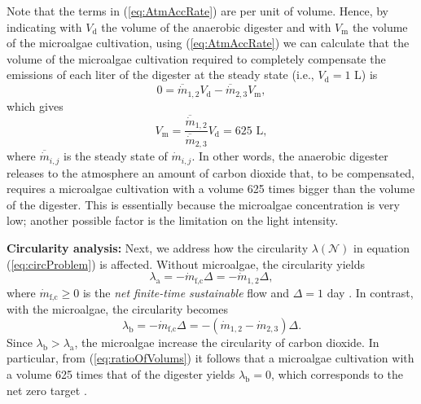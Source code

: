 \documentclass[lettersize,journal]{IEEEtran}
\begin{document}
Note that the terms in (\ref{eq:AtmAccRate}) are per unit of volume. Hence, by indicating with $V_\text{d}$ the volume of the anaerobic digester and with $V_\text{m}$ the volume of the microalgae cultivation, using (\ref{eq:AtmAccRate}) we can calculate that the volume of the microalgae cultivation required to completely compensate the emissions of each liter of the digester at the steady state (i.e., $V_{\text{d}} = 1$ L) is
\begin{equation}
0 = \overline{\dot{m}}_{1,2} V_\text{d} - \overline{\dot{m}}_{2,3} V_\text{m}, 
\end{equation}
which gives
\begin{equation}\label{eq:ratioOfVolums}
V_\text{m} = \frac{\overline{\dot{m}}_{1,2}}{\overline{\dot{m}}_{2,3}}V_\text{d} = 625 \,\, \text{L},
\end{equation}    
where $\overline{\dot{m}}_{i,j}$ is the steady state of $\dot{m}_{i,j}$. In other words, the anaerobic digester releases to the atmosphere an amount of carbon dioxide that, to be compensated, requires a microalgae cultivation with a volume 625 times bigger than the volume of the digester. This is essentially because the microalgae concentration is very low; another possible factor is the limitation on the light intensity. 


\textbf{Circularity analysis:} Next, we address how the circularity $\lambda(\mathcal{N})$ in equation (\ref{eq:circProblem}) is affected. Without microalgae, the circularity yields 
\begin{equation}
\lambda_\text{a} = - \dot{m}_{\text{f,c}}\Delta = - \dot{m}_{1,2}\Delta,
\end{equation}
where $\dot{m}_{\text{f,c}} \geq 0$ is the \emph{net finite-time sustainable} flow and $\Delta = 1$ day \cite{zocco2024circular}. In contrast, with the microalgae, the circularity becomes 
\begin{equation}
\lambda_\text{b} = - \dot{m}_{\text{f,c}}\Delta = - (\dot{m}_{1,2} - \dot{m}_{2,3})\Delta. 
\end{equation}
Since $\lambda_\text{b} > \lambda_\text{a}$, the microalgae increase the circularity of carbon dioxide. In particular, from (\ref{eq:ratioOfVolums}) it follows that a microalgae cultivation with a volume 625 times that of the digester yields $\lambda_\text{b} = 0$, which corresponds to the net zero target \cite{NZdefinition}.




 
\end{document}
